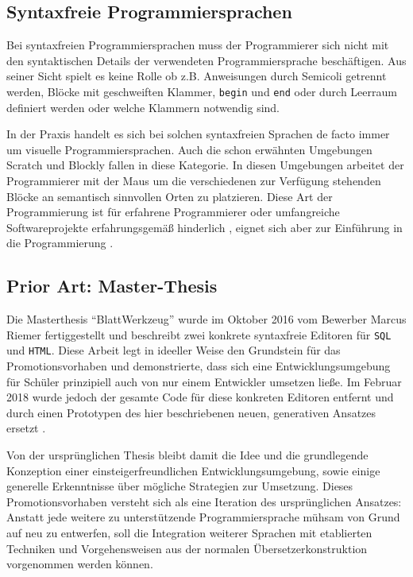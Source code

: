 \documentclass[paper=a4,fontsize=12pt,parskip=half]{scrartcl}
\begin{document}
\subsection{Syntaxfreie Programmiersprachen}

Bei syntaxfreien Programmiersprachen muss der Programmierer sich nicht mit den syntaktischen Details der verwendeten Programmiersprache beschäftigen. Aus seiner Sicht spielt es keine Rolle ob z.B. Anweisungen durch Semicoli getrennt werden, Blöcke mit geschweiften Klammer, \texttt{begin} und \texttt{end} oder durch Leerraum definiert werden oder welche Klammern notwendig sind.

In der Praxis handelt es sich bei solchen syntaxfreien Sprachen de facto immer um visuelle Programmiersprachen. Auch die schon erwähnten Umgebungen Scratch und Blockly fallen in diese Kategorie. In diesen Umgebungen arbeitet der Programmierer mit der Maus um die verschiedenen zur Verfügung stehenden Blöcke an semantisch sinnvollen Orten zu platzieren. Diese Art der Programmierung ist für erfahrene Programmierer oder umfangreiche Softwareprojekte erfahrungsgemäß hinderlich \cite[S. 262f]{schiffer_visuelle_2001}, eignet sich aber zur Einführung in die Programmierung \cite{resnick_scratch:_2009}.

\subsection{Prior Art: Master-Thesis}

Die Masterthesis \enquote{BlattWerkzeug} \cite{riemer_blattwerkzeug_2016}  wurde im Oktober 2016 vom Bewerber Marcus Riemer fertiggestellt und beschreibt zwei konkrete syntaxfreie Editoren für \texttt{SQL} und \texttt{HTML}. Diese Arbeit legt in ideeller Weise den Grundstein für das Promotionsvorhaben und demonstrierte, dass sich eine Entwicklungsumgebung für Schüler prinzipiell auch von nur einem Entwickler umsetzen ließe. Im Februar 2018 wurde jedoch der gesamte Code für diese konkreten Editoren entfernt und durch einen Prototypen des hier beschriebenen neuen, generativen Ansatzes ersetzt \cite{riemer_commit_2018}.

Von der ursprünglichen Thesis bleibt damit die Idee und die grundlegende Konzeption einer einsteigerfreundlichen Entwicklungsumgebung, sowie einige generelle Erkenntnisse über mögliche Strategien zur Umsetzung. Dieses Promotionsvorhaben versteht sich als eine Iteration des ursprünglichen Ansatzes: Anstatt jede weitere zu unterstützende Programmiersprache mühsam von Grund auf neu zu entwerfen, soll die Integration weiterer Sprachen mit etablierten Techniken und Vorgehensweisen aus der normalen Übersetzerkonstruktion vorgenommen werden können.
\end{document}
